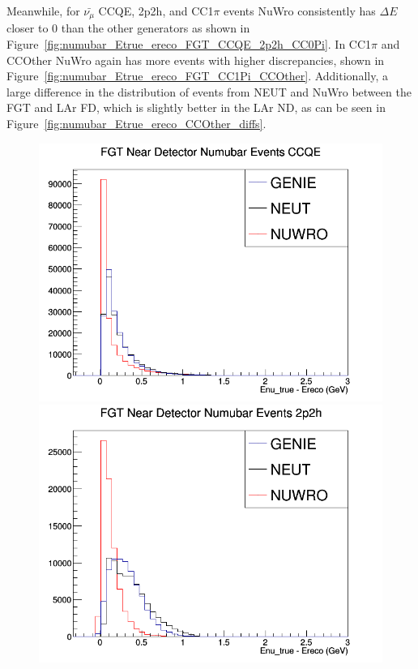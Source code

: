 \documentclass[12pt]{article}
\begin{document}
Meanwhile, for $\bar{\nu_\mu}$ CCQE, 2p2h, and CC1$\pi$ events NuWro consistently has $\Delta E$ closer to 0 than the other generators as shown in Figure~\ref{fig:numubar_Etrue_ereco_FGT_CCQE_2p2h_CC0Pi}. In CC1$\pi$ and CCOther NuWro again has more events with higher discrepancies, shown in Figure~\ref{fig:numubar_Etrue_ereco_FGT_CC1Pi_CCOther}. Additionally, a large difference in the distribution of events from NEUT and NuWro between the FGT and LAr FD, which is slightly better in the LAr ND, as can be seen in Figure~\ref{fig:numubar_Etrue_ereco_CCOther_diffs}.
\begin{figure}[h]
\centering
{}
\includegraphics[width=\linewidth]{Ereco_Etrue/numubar_FGT_CCQE.png}
\endminipage
{}
\includegraphics[width=\linewidth]{Ereco_Etrue/numubar_FGT_2p2h.png}

\end{figure}
\end{document}
